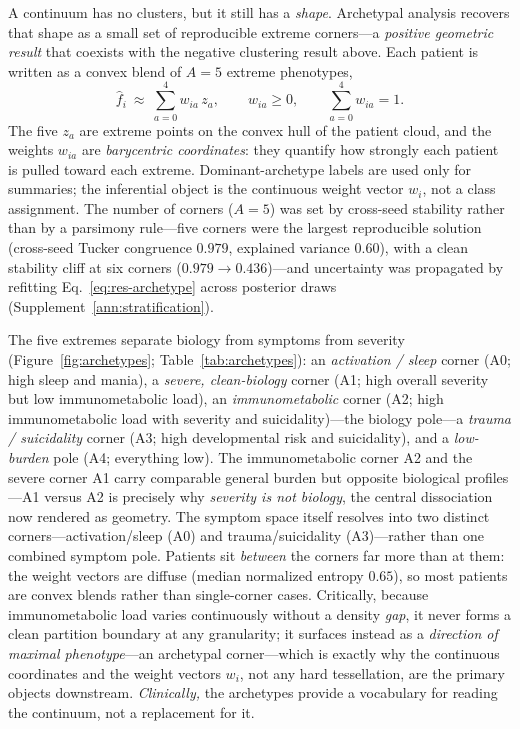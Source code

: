 A continuum has no clusters, but it still has a \emph{shape}. Archetypal analysis recovers
that shape as a small set of reproducible extreme corners---a \emph{positive geometric
result} that coexists with the negative clustering result above. Each patient is written
as a convex blend of $A=5$ extreme phenotypes,
\begin{equation}
  \hat f_i\ \approx\ \sum_{a=0}^{4} w_{ia}\,z_a,\qquad
  w_{ia}\ge 0,\qquad \sum_{a=0}^{4} w_{ia}=1 .
  \label{eq:res-archetype}
\end{equation}
The five $z_a$ are extreme points on the convex hull of the patient cloud, and the
weights $w_{ia}$ are \emph{barycentric coordinates}: they quantify how strongly each
patient is pulled toward each extreme. Dominant-archetype labels are used only for
summaries; the inferential object is the continuous weight vector $w_i$, not a class
assignment. The number of corners ($A=5$) was set by cross-seed stability rather than by
a parsimony rule---five corners were the largest reproducible solution (cross-seed Tucker
congruence $0.979$, explained variance $0.60$), with a clean stability cliff at six
corners ($0.979\!\to\!0.436$)---and uncertainty was propagated by refitting
Eq.~\eqref{eq:res-archetype} across posterior draws (Supplement~\ref{ann:stratification}).

The five extremes separate biology from symptoms from severity (Figure~\ref{fig:archetypes};
Table~\ref{tab:archetypes}):
an \emph{activation / sleep} corner (A0; high sleep and mania), a \emph{severe,
clean-biology} corner (A1; high overall severity but low immunometabolic load), an
\emph{immunometabolic} corner (A2; high immunometabolic load with severity and
suicidality)---the biology pole---a \emph{trauma / suicidality} corner (A3; high
developmental risk and suicidality), and a \emph{low-burden} pole (A4; everything low).
The immunometabolic corner A2 and the severe corner A1 carry comparable general burden
but opposite biological profiles---A1 versus A2 is precisely why \emph{severity is not
biology}, the central dissociation now rendered as geometry. The symptom space itself
resolves into two distinct corners---activation/sleep (A0) and trauma/suicidality
(A3)---rather than one combined symptom pole. Patients sit \emph{between} the corners far
more than at them: the weight vectors are diffuse (median normalized entropy $0.65$), so
most patients are convex blends rather than single-corner cases. Critically, because
immunometabolic load varies continuously without a density \emph{gap}, it never forms a
clean partition boundary at any granularity; it surfaces instead as a \emph{direction of
maximal phenotype}---an archetypal corner---which is exactly why the continuous
coordinates and the weight vectors $w_i$, not any hard tessellation, are the primary
objects downstream. \emph{Clinically,} the archetypes provide a vocabulary for reading the
continuum, not a replacement for it.

